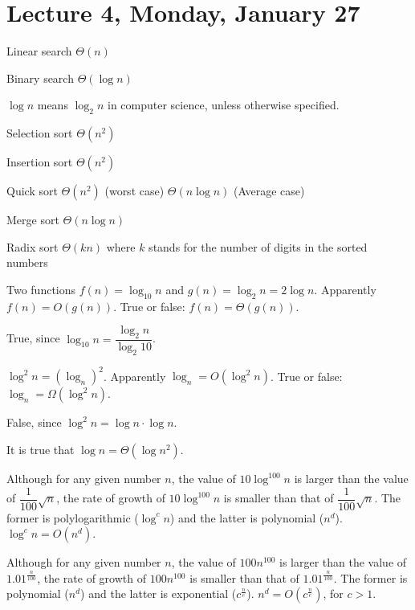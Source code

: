 \section{Lecture 4, Monday, January 27}

Linear search $\Theta(n)$

Binary search $\Theta(\log n)$

\begin{remark}
$\log n$ means $\log_2 n$ in computer science, unless otherwise specified.
\end{remark}

Selection sort $\Theta(n^2)$

Insertion sort $\Theta(n^2)$

Quick sort $\Theta(n^2)$ (worst case) $\Theta(n\log n)$ (Average case)

Merge sort $\Theta(n \log n)$

Radix sort $\Theta(kn)$ where $k$ stands for the number of digits in the sorted numbers

\begin{ex}
Two functions $f(n) = \log_{10} n$ and $g(n) = \log_2 n = 2 \log n$. Apparently $f(n) = O(g(n))$. True or false: $f(n) = \Theta(g(n))$.

True, since $\log_{10} n = \dfrac{\log_2 n}{\log_2 10}$.
\end{ex}

\begin{ex}
$\log^2 n = (\log_n)^2$. Apparently $\log_n = O(\log^2 n)$. True or false: $\log_n = \Omega(\log^2 n)$.

False, since $\log^2 n = \log n \cdot \log n$.
\end{ex}

\begin{ex}
It is true that $\log n = \Theta(\log n^2)$.
\end{ex}

\begin{ex}
Although for any given number $n$, the value of $10 \log^{100} n$ is larger than the value of $\dfrac{1}{100} \sqrt{n}$, the rate of growth of $10 \log^{100} n$ is smaller than that of $\dfrac{1}{100} \sqrt{n}$. The former is polylogarithmic ($\log^c n$) and the latter is polynomial ($n^d$). $\log^c n = O (n^d)$.
\end{ex}

\begin{ex}
Although for any given number $n$, the value of $100 n^100$ is larger than the value of $1.01^{\tfrac{n}{100}}$, the rate of growth of $100 n^100$ is smaller than that of $1.01^{\tfrac{n}{100}}$. The former is polynomial ($n^d$) and the latter is exponential ($c^{\tfrac{n}{e}}$). $n^d = O (c^{\tfrac{n}{e}})$, for $c > 1$.
\end{ex}

